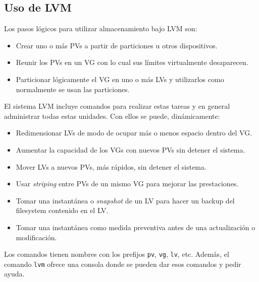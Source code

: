 \subsection {Uso de LVM}
Los pasos lógicos para utilizar almacenamiento bajo LVM son: 
\begin{itemize}
	\item Crear uno o más PVs a partir de particiones u otros dispositivos.
	\item Reunir los PVs en un VG con lo cual sus límites virtualmente desaparecen.
	\item Particionar lógicamente el VG en uno o más LVs y utilizarlos como normalmente se usan las particiones.
\end{itemize}

\begin{comment}
\figura[8]{LVMcomponentes}{Volúmenes físicos (PV), Grupos de Volúmenes (VG) y Volúmenes Lógicos (LV)} {LVM-componentes.jpg}
\end{comment}

El sistema LVM incluye comandos para realizar estas tareas y en general administrar todas estas unidades. Con ellos se puede, dinámicamente:
\begin{itemize}
	\item Redimensionar LVs de modo de ocupar más o menos espacio dentro del VG.
	\item Aumentar la capacidad de los VGs con nuevos PVs sin detener el sistema.
	\item Mover LVs a nuevos PVs, más rápidos, sin detener el sistema.
	\item Usar \emph{striping} entre PVs de un mismo VG para mejorar las prestaciones.
	\item Tomar una instantánea o \emph{snapshot} de un LV para hacer un backup del filesystem contenido en el LV.
	\item Tomar una instantánea como medida preventiva antes de una actualización o modificación.
\end{itemize}



Los comandos tienen nombres con los prefijos \lstinline$pv$, \lstinline$vg$, \lstinline$lv$, etc. Además, el comando \lstinline$lvm$ ofrece una consola donde se pueden dar esos comandos y pedir ayuda.

	



